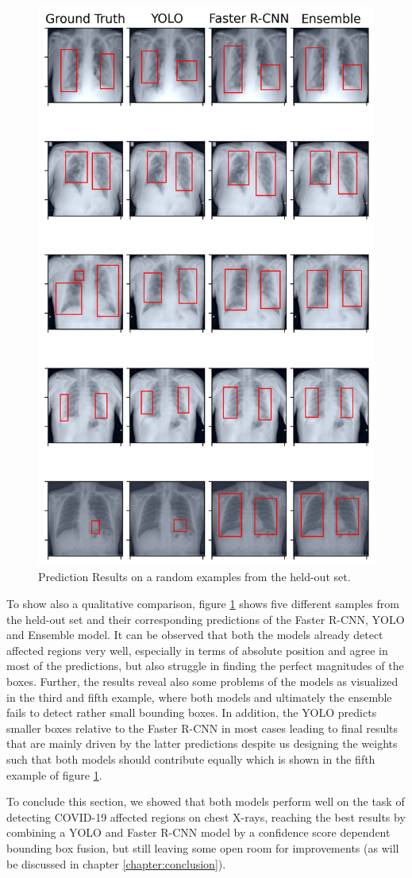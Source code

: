 \begin{figure}[h!]
	\centering
	\includegraphics[width=0.6\linewidth]{img/combo.png}
	\caption{Prediction Results on a random examples from the held-out set.}
	\label{fig:combo_eval}
\end{figure}

To show also a qualitative comparison, figure \ref{fig:combo_eval} shows five different samples from the held-out set and their corresponding predictions of the Faster \ac{R-CNN}, \ac{YOLO} and Ensemble model. It can be observed that both the models already detect affected regions very well, especially in terms of absolute position and agree in most of the predictions, but also struggle in finding the perfect magnitudes of the boxes. Further, the results reveal also some problems of the models as visualized in the third and fifth example, where both models and ultimately the ensemble fails to detect rather small bounding boxes. In addition, the \ac{YOLO} predicts smaller boxes relative to the Faster \ac{R-CNN} in most cases leading to final results that are mainly driven by the latter predictions despite us designing the weights such that both models should contribute equally which is shown in the fifth example of figure \ref{fig:combo_eval}. 

To conclude this section, we showed that both models perform well on the task of detecting COVID-19 affected regions on chest X-rays, reaching the best results by combining a \ac{YOLO} and Faster \ac{R-CNN} model by a confidence score dependent bounding box fusion, but still leaving some open room for improvements (as will be discussed in chapter \ref{chapter:conclusion}).

